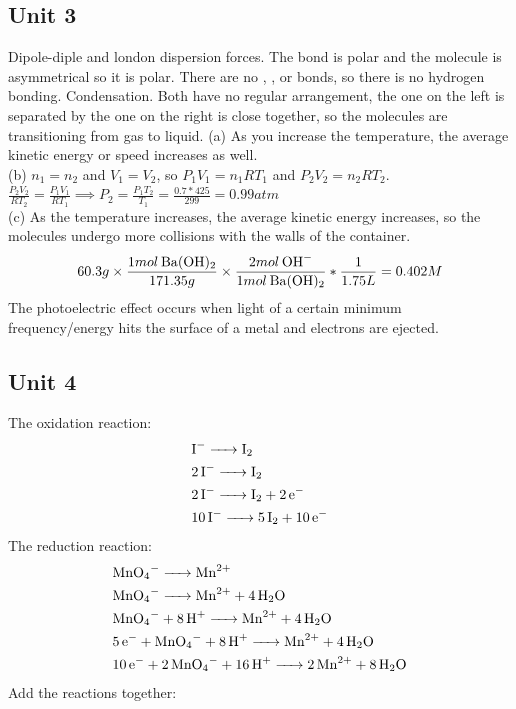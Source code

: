\documentclass{article}
\begin{document}
\subsection{Unit 3}
\AnswerSet
Dipole-diple and london dispersion forces. The  bond is polar and the molecule is asymmetrical so it is polar. There are no , , or  bonds, so there is no hydrogen bonding. 
\AnswerSet
Condensation. Both have no regular arrangement, the one on the left is separated by the one on the right is close together, so the molecules are transitioning from gas to liquid.
\AnswerSet
(a) As you increase the temperature, the average kinetic energy or speed increases as well. \\
(b) \(n_1 = n_2\) and \(V_1 = V_2\), so \(P_1V_1 = n_1RT_1\) and \(P_2V_2 = n_2RT_2\). \(\frac{P_2V_2}{RT_2} = \frac{P_1V_1}{RT_1} \implies P_2 = \frac{P_1T_2}{T_1} = \frac{0.7 * 425}{299} = 0.99atm\)\\
(c) As the temperature increases, the average kinetic energy increases, so the molecules undergo more collisions with the walls of the container.  \\
\AnswerSet
\begin{equation*}
    60.3g \times \frac{1mol\hspace{0.2em}\ce{Ba(OH)2}}{171.35g} \times \frac{2mol\hspace{0.2em}\ce{OH-}}{1mol\hspace{0.2em}\ce{Ba(OH)2}} * \frac{1}{1.75L} = 0.402M
\end{equation*}
\AnswerSet
The photoelectric effect occurs when light of a certain minimum frequency/energy hits the surface of a metal and electrons are ejected. 
\subsection{Unit 4}
\AnswerSet
{}
\AnswerSet
The oxidation reaction: \\
\begin{equation*}
\begin{aligned}
& \ce{I- -> I2} \\
& \ce{2I- -> I2}\\
& \ce{2I- -> I2 + 2e-} \\
& \ce{10I- -> 5I2 + 10e-}
\end{aligned}
\end{equation*}
The reduction reaction:
\begin{equation*}
    \begin{aligned}
        & \ce{MnO4- -> Mn^{2+}} \\
        & \ce{MnO4- -> Mn^{2+} + 4H2O}\\
        & \ce{MnO4- + 8H+ -> Mn^{2+} + 4H2O} \\
        & \ce{5e- + MnO4- + 8H+ -> Mn^{2+} + 4H2O} \\
        & \ce{10e- + 2MnO4- + 16H+ -> 2Mn^{2+} + 8H2O}
    \end{aligned}
\end{equation*}
Add the reactions together: \\
\end{document}
